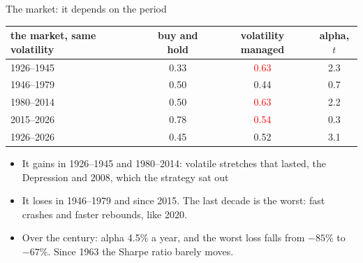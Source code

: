 \documentclass[aspectratio=169,10pt]{beamer}
\begin{document}
\begin{frame}{The market: it depends on the period}
\vskip 4pt
\begin{center}
\renewcommand{\arraystretch}{1.3}
\begin{tabular}{lccc}
\toprule
the market, same volatility & buy and hold & volatility managed & alpha, $t$ \\
\midrule
1926--1945 & 0.33 & \textcolor{red}{0.63} & 2.3 \\
1946--1979 & 0.50 & 0.44 & 0.7 \\
1980--2014 & 0.50 & \textcolor{red}{0.63} & 2.2 \\
2015--2026 & 0.78 & \textcolor{red}{0.54} & 0.3 \\
\midrule
1926--2026 & 0.45 & 0.52 & 3.1 \\
\bottomrule
\end{tabular}
\end{center}
\vskip 8pt
\begin{itemize}
\item It gains in 1926--1945 and 1980--2014: volatile stretches that lasted, the Depression and 2008, which the strategy sat out
\vskip 5pt
\item It loses in 1946--1979 and since 2015. The last decade is the worst: fast crashes and faster rebounds, like 2020.
\vskip 5pt
\item Over the century: alpha 4.5\% a year, and the worst loss falls from $-85\%$ to $-67\%$. Since 1963 the Sharpe ratio barely moves.
\end{itemize}
\end{frame}
\end{document}
